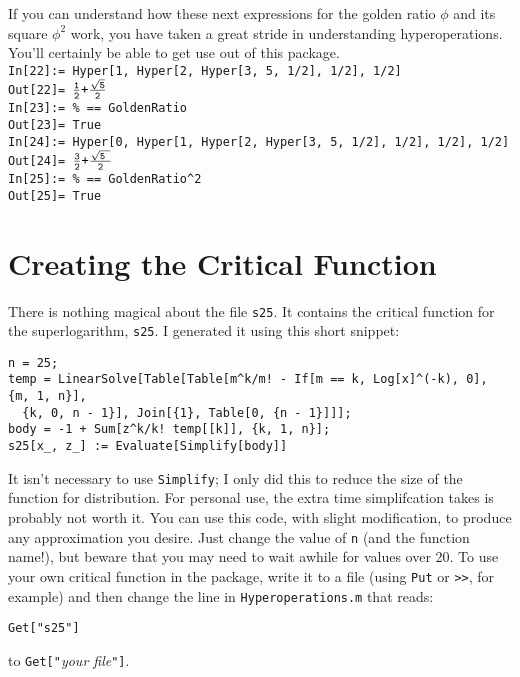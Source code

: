 \documentclass[letterpaper]{article}
\begin{document}
If you can understand how these next expressions for the golden ratio $\phi$ and its square $\phi^2$ work, you have taken a great stride in understanding hyperoperations.  You'll certainly be able to get use out of this package. \\

\noindent\verb|In[22]:= Hyper[1, Hyper[2, Hyper[3, 5, 1/2], 1/2], 1/2]| \\
\noindent\verb|Out[22]= |$\frac{\texttt{1}}{\texttt{2}} \verb|+| \frac{\sqrt{\texttt{5}}}{\texttt{2}}$ \\
\noindent\verb|In[23]:= % == GoldenRatio| \\
\noindent\verb|Out[23]= True| \\

\noindent\verb|In[24]:= Hyper[0, Hyper[1, Hyper[2, Hyper[3, 5, 1/2], 1/2], 1/2], 1/2]| \\
\noindent\verb|Out[24]= |$\frac{\texttt{3}}{\texttt{2}} \verb|+| \frac{\sqrt{\texttt{5
}}}{\texttt{2}}$ \\
\noindent\verb|In[25]:= % == GoldenRatio^2| \\
\noindent\verb|Out[25]= True| \\

\section{Creating the Critical Function}

There is nothing magical about the file \verb|s25|.  It contains the critical function for the superlogarithm, \verb|s25|.  I generated it using this short snippet:

\begin{verbatim}
n = 25;
temp = LinearSolve[Table[Table[m^k/m! - If[m == k, Log[x]^(-k), 0], {m, 1, n}],
  {k, 0, n - 1}], Join[{1}, Table[0, {n - 1}]]];
body = -1 + Sum[z^k/k! temp[[k]], {k, 1, n}];
s25[x_, z_] := Evaluate[Simplify[body]]
\end{verbatim}

It isn't necessary to use \verb|Simplify|; I only did this to reduce the size of the function for distribution.  For personal use, the extra time simplifcation takes is probably not worth it.  You can use this code, with slight modification, to produce any approximation you desire.  Just change the value of \verb|n| (and the function name!), but beware that you may need to wait awhile for values over 20.  To use your own critical function in the package, write it to a file (using \verb|Put| or \verb|>>|, for example) and then change the line in \verb|Hyperoperations.m| that reads:
\begin{verbatim}
Get["s25"]
\end{verbatim}
to \verb|Get["|\emph{your file}\verb|"]|.
\end{document}
